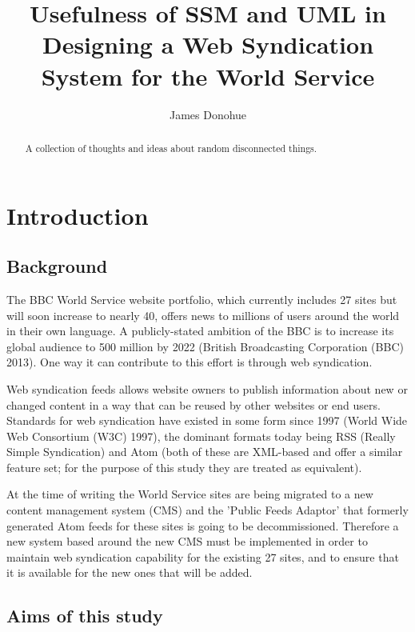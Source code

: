 \documentclass{article}
\begin{document}
\title{Usefulness of SSM and UML in Designing a Web Syndication System for the World Service}
\author{James Donohue}

\maketitle

\begin{abstract}
A collection of thoughts and ideas about random disconnected things.
\end{abstract}

\tableofcontents

\section{Introduction}
\subsection{Background}

The BBC World Service website portfolio, which currently includes 27 sites but will soon increase to nearly 40, offers news to millions of users around the world in their own language. A publicly-stated ambition of the BBC is to increase its global audience to 500 million by 2022 (British Broadcasting Corporation (BBC) 2013). One way it can contribute to this effort is through web syndication.

Web syndication feeds allows website owners to publish information about new or changed content in a way that can be reused by other websites or end users. Standards for web syndication have existed in some form since 1997 (World Wide Web Consortium (W3C) 1997), the dominant formats today being RSS (Really Simple Syndication) and Atom (both of these are XML-based and offer a similar feature set; for the purpose of this study they are treated as equivalent).

At the time of writing the World Service sites are being migrated to a new content management system (CMS) and the 'Public Feeds Adaptor' that formerly generated Atom feeds for these sites is going to be decommissioned. Therefore a new system based around the new CMS must be implemented in order to maintain web syndication capability for the existing 27 sites, and to ensure that it is available for the new ones that will be added.

\subsection{Aims of this study}
\end{document}
